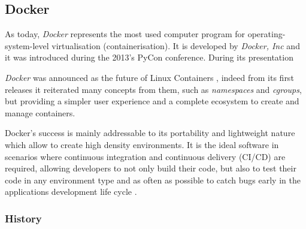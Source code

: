 \documentclass[a4paper,12pt]{article}
\begin{document}
\subsection{Docker}

As today, \textit{Docker} represents the most used computer program for
operating-system-level virtualisation (containerisation). It is developed by
\textit{Docker, Inc} \cite{docker_official_site} and it was introduced during
the 2013's PyCon conference. During its presentation \par\textit{Docker} was
announced as the future of Linux Containers \cite{docker_pycon_presentation},
indeed from its first releases it reiterated many concepts from them, such as
\textit{namespaces} and \textit{cgroups}, but providing a simpler user
experience and a complete ecosystem to create and manage containers.\par
Docker's success is mainly addressable to its portability and lightweight nature
which allow to create high density environments. It is the ideal software in
scenarios where continuous integration and continuous delivery (CI/CD) are
required, allowing developers to not only build their code, but also to test
their code in any environment type and as often as possible to catch bugs early
in the applications development life cycle \cite{docker_ci_cd}. 

\subsubsection{History}
\end{document}
